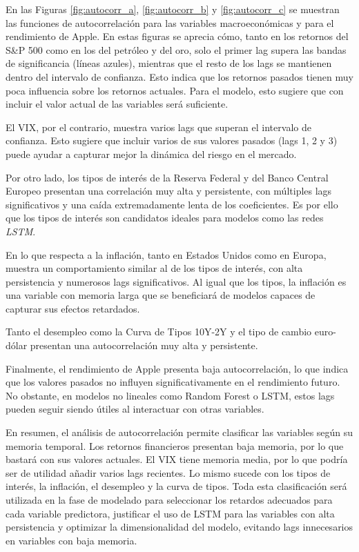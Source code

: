 En las Figuras \ref{fig:autocorr_a}, \ref{fig:autocorr_b} y \ref{fig:autocorr_c} se muestran las funciones de autocorrelación para las variables macroeconómicas y para el rendimiento de Apple. En estas figuras se aprecia cómo, tanto en los retornos del S\&P 500 como en los del petróleo y del oro, solo el primer lag supera las bandas de significancia (líneas azules), mientras que el resto de los lags se mantienen dentro del intervalo de confianza. Esto indica que los retornos pasados tienen muy poca influencia sobre los retornos actuales. Para el modelo, esto sugiere que con incluir el valor actual de las variables será suficiente.

El VIX, por el contrario, muestra varios lags que superan el intervalo de confianza. Esto sugiere que incluir varios de sus valores pasados (lags 1, 2 y 3) puede ayudar a capturar mejor la dinámica del riesgo en el mercado.

Por otro lado, los tipos de interés de la Reserva Federal y del Banco Central Europeo presentan una correlación muy alta y persistente, con múltiples lags significativos y una caída extremadamente lenta de los coeficientes. Es por ello que los tipos de interés son candidatos ideales para modelos como las redes \emph{LSTM}.

En lo que respecta a la inflación, tanto en Estados Unidos como en Europa, muestra un comportamiento similar al de los tipos de interés, con alta persistencia y numerosos lags significativos. Al igual que los tipos, la inflación es una variable con memoria larga que se beneficiará de modelos capaces de capturar sus efectos retardados.

Tanto el desempleo como la Curva de Tipos 10Y-2Y y el tipo de cambio euro-dólar presentan una autocorrelación muy alta y persistente.

Finalmente, el rendimiento de Apple presenta baja autocorrelación, lo que indica que los valores pasados no influyen significativamente en el rendimiento futuro. No obstante, en modelos no lineales como Random Forest o LSTM, estos lags pueden seguir siendo útiles al interactuar con otras variables.

En resumen, el análisis de autocorrelación permite clasificar las variables según su memoria temporal. Los retornos financieros presentan baja memoria, por lo que bastará con sus valores actuales. El VIX tiene memoria media, por lo que podría ser de utilidad añadir varios lags recientes. Lo mismo sucede con los tipos de interés, la inflación, el desempleo y la curva de tipos. Toda esta clasificación será utilizada en la fase de modelado para seleccionar los retardos adecuados para cada variable predictora, justificar el uso de LSTM para las variables con alta persistencia y optimizar la dimensionalidad del modelo, evitando lags innecesarios en variables con baja memoria.

